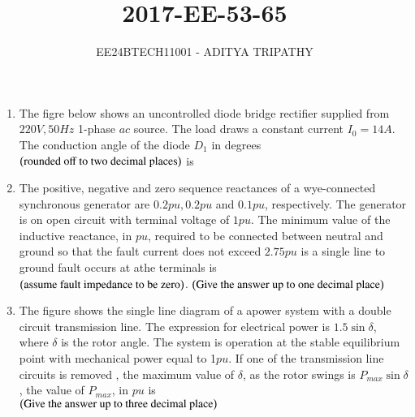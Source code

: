 \documentclass[journal,12pt,onecolumn]{IEEEtran}
\theoremstyle{remark}
\begin{document}

\vspace{3cm}

\title{2017-EE-53-65}
\author{EE24BTECH11001 -  ADITYA TRIPATHY}
\maketitle

\renewcommand{\thefigure}{\theenumi}
\renewcommand{\thetable}{\theenumi}

\begin{enumerate}
    \item 
        The figre below shows an uncontrolled diode bridge rectifier supplied from $220V, 50Hz$ 
        1-phase $ac$ source. The load draws a constant current $I_0 = 14A$. The conduction angle
        of the diode $D_1$ in degrees $\left(\textnormal{rounded off to two decimal places}\right)$ is 
        \hfill{}
        \begin{center}
            \resizebox{0.5\textwidth}{!}{
                
            }
        \end{center}
    \item The positive, negative and zero sequence reactances of a wye-connected synchronous generator
        are $0.2 pu, 0.2 pu$ and $0.1 pu$, respectively. The generator is on open circuit with terminal 
        voltage of $1 pu$. The minimum value of the inductive reactance, in $pu$, required to be 
        connected between neutral and ground so that the fault current does not exceed $2.75 pu$ is a single
        line to ground fault occurs at athe terminals is \\
        $\left(\textnormal{assume fault impedance to be zero}\right)$. $\left(\textnormal{Give the answer up to one decimal place}\right)$

        \hfill{}

    \item The figure shows the single line diagram of a apower system with a double circuit 
        transmission line. The expression for electrical power is $1.5 \sin \delta$, where
        $\delta$ is the rotor angle. The system is operation at the stable equilibrium point
        with mechanical power equal to 1$pu$. If one of the transmission line circuits is removed
        , the maximum value of $\delta$, as the rotor swings is $P_{max} \sin \delta$, the value
        of $P_{max}$, in $pu$ is \\
        $\left(\textnormal{Give the answer up to three decimal place}\right)$


\end{enumerate}
\end{document}
